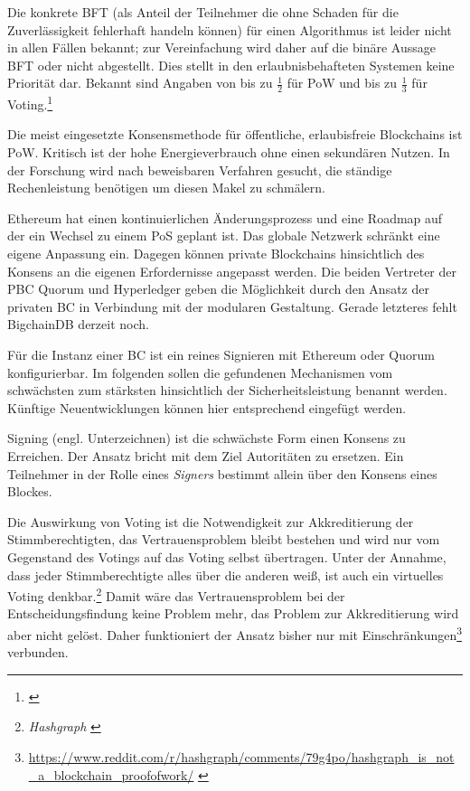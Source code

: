 Die konkrete \gls{BFT} (als Anteil der Teilnehmer die ohne Schaden für die Zuverlässigkeit fehlerhaft handeln können) für einen Algorithmus ist leider nicht in allen Fällen bekannt; zur Vereinfachung wird daher auf die binäre Aussage \gls{BFT} oder nicht abgestellt.
Dies stellt in den erlaubnisbehafteten Systemen keine Priorität dar.
Bekannt sind Angaben von bis zu \(\frac{1}{2}\) für \gls{PoW} und bis zu \(\frac{1}{3}\) für Voting.\footnote{\cite{p:hyperledger:consensus}}

Die meist eingesetzte Konsensmethode für öffentliche, erlaubisfreie Blockchains ist \gls{PoW}. 
Kritisch ist der hohe Energieverbrauch ohne einen sekundären Nutzen.
In der Forschung wird nach beweisbaren Verfahren gesucht, die ständige Rechenleistung benötigen um diesen Makel zu schmälern.

Ethereum hat einen kontinuierlichen Änderungsprozess und eine Roadmap auf der ein Wechsel zu einem \gls{PoS} geplant ist.
Das globale Netzwerk schränkt eine eigene Anpassung ein.
Dagegen können private Blockchains hinsichtlich des Konsens an die eigenen Erfordernisse angepasst werden. 
Die beiden Vertreter der \gls{PBC} Quorum und Hyperledger geben die Möglichkeit durch den Ansatz der privaten \gls{BC} in Verbindung mit der modularen Gestaltung.
Gerade letzteres fehlt BigchainDB derzeit noch.

Für die Instanz einer \gls{BC} ist ein reines Signieren \zB{} mit Ethereum oder Quorum konfigurierbar.
Im folgenden sollen die gefundenen Mechanismen vom schwächsten zum stärksten hinsichtlich der Sicherheitsleistung benannt werden.
Künftige Neuentwicklungen können hier entsprechend eingefügt werden.

Signing (engl. Unterzeichnen) ist die schwächste Form einen Konsens zu Erreichen.
Der Ansatz bricht mit dem Ziel Autoritäten zu ersetzen.
Ein Teilnehmer in der Rolle eines \emph{Signers} bestimmt allein über den Konsens eines Blockes.

Die Auswirkung von Voting ist die Notwendigkeit zur Akkreditierung der Stimmberechtigten, das Vertrauensproblem bleibt bestehen und wird nur vom Gegenstand des Votings auf das Voting selbst übertragen.
Unter der Annahme, dass jeder Stimmberechtigte alles über die anderen weiß, ist auch ein virtuelles Voting denkbar.\footnote{\emph{Hashgraph} \autocite{p:hashgraph}}
Damit wäre das Vertrauensproblem bei der Entscheidungsfindung keine Problem mehr, das Problem zur Akkreditierung wird aber nicht gelöst.
Daher funktioniert der Ansatz bisher nur mit Einschränkungen\footnote{\url{https://www.reddit.com/r/hashgraph/comments/79g4po/hashgraph_is_not_a_blockchain_proofofwork/}  \autocite{w:reddit}} verbunden.

